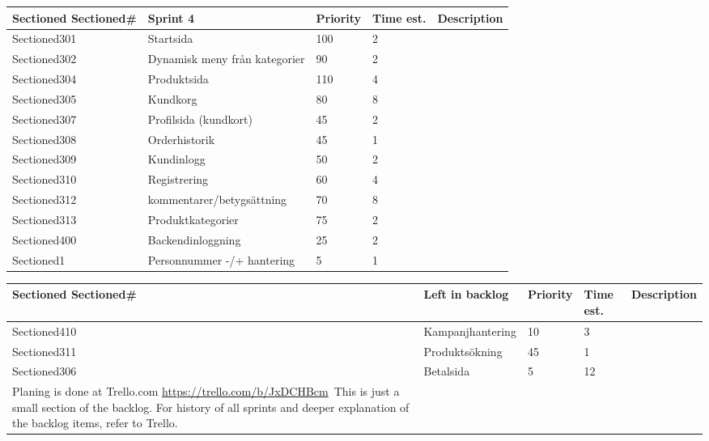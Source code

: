 \documentclass[paper=a4, fontsize=11pt]{report} %
\begin{document}
\begin{itemize}
		\begin{tabular}{|l|l|l|l|l|}
		Sectioned\hline
		Sectioned\#  & Sprint 4                      & Priority & Time est. & Description \\ \hline
		Sectioned301 & Startsida                     & 100      & 2         &             \\ \hline
		Sectioned302 & Dynamisk meny från kategorier & 90       & 2         &             \\ \hline
		Sectioned304 & Produktsida                   & 110      & 4         &             \\ \hline
		Sectioned305 & Kundkorg                      & 80       & 8         &             \\ \hline
		Sectioned307 & Profilsida (kundkort)         & 45       & 2         &             \\ \hline
		Sectioned308 & Orderhistorik                 & 45       & 1         &             \\ \hline
		Sectioned309 & Kundinlogg                    & 50       & 2         &             \\ \hline
		Sectioned310 & Registrering                  & 60       & 4         &             \\ \hline
		Sectioned312 & kommentarer/betygsättning     & 70       & 8         &             \\ \hline
		Sectioned313 & Produktkategorier             & 75       & 2         &             \\ \hline
		Sectioned400 & Backendinloggning             & 25       & 2         &             \\ \hline
		Sectioned1   & Personnummer -/+ hantering    & 5        & 1         &             \\ \hline
		\end{tabular}

		\begin{tabular}{|l|l|l|l|l|}
		Sectioned\hline
		Sectioned\#  & Left in backlog  & Priority & Time est. & Description \\ \hline
		Sectioned410 & Kampanjhantering & 10       & 3         &             \\ \hline
		Sectioned311 & Produktsökning   & 45       & 1         &             \\ \hline
		Sectioned306 & Betalsida        & 5        & 12        &             \\ \hline


		Planing is done at Trello.com
		\url{https://trello.com/b/JxDCHBcm}\
				This is just a small section of the backlog. For history of all sprints and deeper
				explanation of the backlog items, refer to Trello.


\end{tabular}
\end{itemize}
\end{document}
